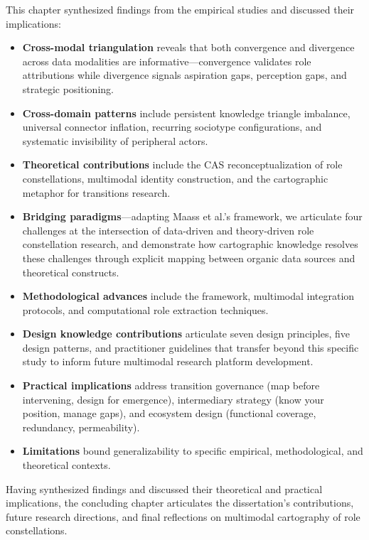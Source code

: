 \documentclass[../main.tex]{subfiles}
\begin{document}
\begin{summarybox}
This chapter synthesized findings from the empirical studies and discussed their implications:

\begin{itemize}[leftmargin=*, itemsep=0.3em]
\item \textbf{Cross-modal triangulation} reveals that both convergence and divergence across data modalities are informative---convergence validates role attributions while divergence signals aspiration gaps, perception gaps, and strategic positioning.

\item \textbf{Cross-domain patterns} include persistent knowledge triangle imbalance, universal connector inflation, recurring sociotype configurations, and systematic invisibility of peripheral actors.

\item \textbf{Theoretical contributions} include the CAS reconceptualization of role constellations, multimodal identity construction, and the cartographic metaphor for transitions research.

\item \textbf{Bridging paradigms}---adapting Maass et al.'s framework, we articulate four challenges at the intersection of data-driven and theory-driven role constellation research, and demonstrate how cartographic knowledge resolves these challenges through explicit mapping between organic data sources and theoretical constructs.

\item \textbf{Methodological advances} include the \RoleBox{} framework, multimodal integration protocols, and computational role extraction techniques.

\item \textbf{Design knowledge contributions} articulate seven design principles, five design patterns, and practitioner guidelines that transfer beyond this specific study to inform future multimodal research platform development.

\item \textbf{Practical implications} address transition governance (map before intervening, design for emergence), intermediary strategy (know your position, manage gaps), and ecosystem design (functional coverage, redundancy, permeability).

\item \textbf{Limitations} bound generalizability to specific empirical, methodological, and theoretical contexts.
\end{itemize}
\end{summarybox}

\vspace{1em}
Having synthesized findings and discussed their theoretical and practical implications, the concluding chapter articulates the dissertation's contributions, future research directions, and final reflections on multimodal cartography of role constellations.
\end{document}
